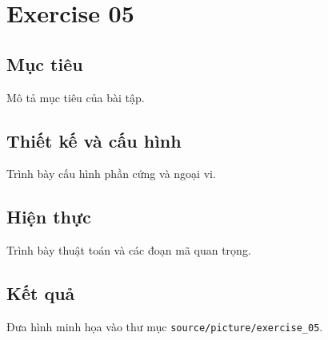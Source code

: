 \chapter{Exercise 05}
\section{Mục tiêu}
Mô tả mục tiêu của bài tập.
\section{Thiết kế và cấu hình}
Trình bày cấu hình phần cứng và ngoại vi.
\section{Hiện thực}
Trình bày thuật toán và các đoạn mã quan trọng.
\section{Kết quả}
Đưa hình minh họa vào thư mục \texttt{source/picture/exercise\_05}.
